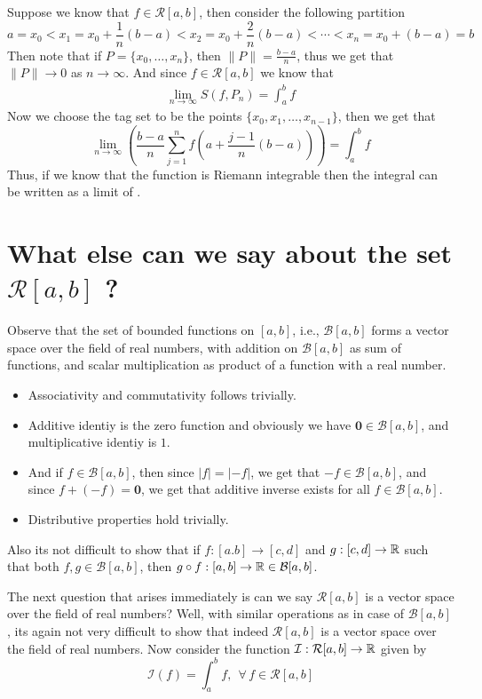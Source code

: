 Suppose we know that $f \in \mathcal{R}[a,b]$, then consider the following partition \[ a = x_0 < x_1 = x_0 + \frac{1}{n}(b-a) < x_2 = x_0 + \frac{2}{n}(b-a) < \cdots < x_n = x_0 + (b-a) = b \]
Then note that if $P = \{x_0,\dots,x_n\}$, then $\|P\| = \frac{b-a}{n}$, thus we get that $\|P\| \to 0$ as $n \to \infty$. And since $f \in \mathcal{R}[a,b]$ we know that 
\begin{align*}
    \lim_{n\to\infty} S(f,P_n) = \int_a^b f
\end{align*}
Now we choose the tag set to be the points $\{x_0,x_1,\dots,x_{n-1}\}$, then we get that 
\begin{equation}\label{eq6:feb4}
    \lim_{n\to\infty}\left(\frac{b-a}{n}\sum_{j=1}^n f \left(a+\frac{j-1}{n}(b-a) \right)\right) = \int_a^b f
\end{equation}
Thus, if we know that the function is Riemann integrable then the integral can be written as a limit of .

\section{What else can we say about the set $\mathcal{R}[a,b]$ ?}

Observe that the set of bounded functions on $[a,b]$, i.e., $\mathcal{B}[a,b]$ forms a vector space over the field of real numbers, with addition on $\mathcal{B}[a,b]$ as sum of functions, and scalar multiplication as product of a function with a real number. 
\begin{itemize}
    \item Associativity and commutativity follows trivially.
    \item Additive identiy is the zero function and obviously we have $\mathbf{0} \in \mathcal{B}[a,b]$, and multiplicative identiy is $1$.
    \item And if $f \in \mathcal{B}[a,b]$, then since $|f| = |-f|$, we get that $-f \in \mathcal{B}[a,b]$, and since $f + (-f) = \mathbf{0}$, we get that additive inverse exists for all $f \in \mathcal{B}[a,b]$.
    \item Distributive properties hold trivially.
\end{itemize} 
Also its not difficult to show that if $f : [a.b] \to [c,d]$ and $g : [c,d] \to \mathbb{R}$ such that both $f,g \in \mathcal{B}[a,b]$, then $g \circ f : [a,b] \to \mathbb{R} \in \mathcal{B}[a,b]$.

The next question that arises immediately is can we say $\mathcal{R}[a,b]$ is a vector space over the field of real numbers? Well, with similar operations as in case of $\mathcal{B}[a,b]$, its again not very difficult to show that indeed $\mathcal{R}[a,b]$ is a vector space over the field of real numbers. Now consider the function $\mathcal{I} : \mathcal{R}[a,b] \to \mathbb{R}$ given by 
\begin{equation}\label{eq7:feb4}
    \mathcal{I}(f) = \int_a^b f, \ \ \forall \, f \in \mathcal{R}[a,b]
\end{equation}


